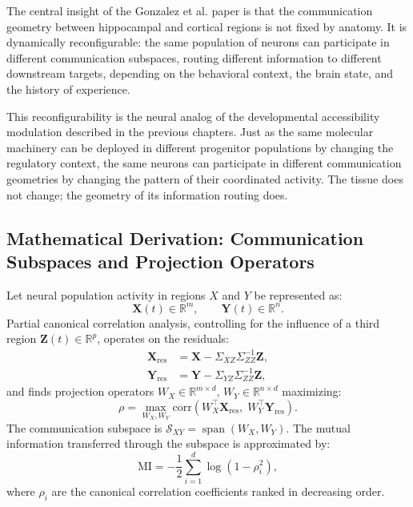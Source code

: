 \documentclass[12pt, a4paper, openany]{book}
\theoremstyle{definition}
\theoremstyle{remark}
\begin{document}
The central insight of the Gonzalez et al. paper is that the communication geometry between hippocampal and cortical regions is not fixed by anatomy. It is dynamically reconfigurable: the same population of neurons can participate in different communication subspaces, routing different information to different downstream targets, depending on the behavioral context, the brain state, and the history of experience.

This reconfigurability is the neural analog of the developmental accessibility modulation described in the previous chapters. Just as the same molecular machinery can be deployed in different progenitor populations by changing the regulatory context, the same neurons can participate in different communication geometries by changing the pattern of their coordinated activity. The tissue does not change; the geometry of its information routing does.

\subsection*{Mathematical Derivation: Communication Subspaces and Projection Operators}

Let neural population activity in regions $X$ and $Y$ be represented as:
\begin{equation}
\mathbf{X}(t) \in \mathbb{R}^m, \qquad \mathbf{Y}(t) \in \mathbb{R}^n.
\end{equation}
Partial canonical correlation analysis, controlling for the influence of a third region $\mathbf{Z}(t) \in \mathbb{R}^p$, operates on the residuals:
\begin{align}
\mathbf{X}_{\text{res}} &= \mathbf{X} - \Sigma_{XZ}\Sigma_{ZZ}^{-1}\mathbf{Z}, \\
\mathbf{Y}_{\text{res}} &= \mathbf{Y} - \Sigma_{YZ}\Sigma_{ZZ}^{-1}\mathbf{Z},
\end{align}
and finds projection operators $W_X \in \mathbb{R}^{m \times d}$, $W_Y \in \mathbb{R}^{n \times d}$ maximizing:
\begin{equation}
\rho = \max_{W_X, W_Y} \text{corr}\!\left(W_X^\top \mathbf{X}_{\text{res}},\; W_Y^\top \mathbf{Y}_{\text{res}}\right).
\end{equation}
The communication subspace is $\mathcal{S}_{XY} = \operatorname{span}(W_X, W_Y)$. The mutual information transferred through the subspace is approximated by:
\begin{equation}
\mathrm{MI} = -\frac{1}{2}\sum_{i=1}^{d} \log(1 - \rho_i^2),
\end{equation}
where $\rho_i$ are the canonical correlation coefficients ranked in decreasing order.
\end{document}
